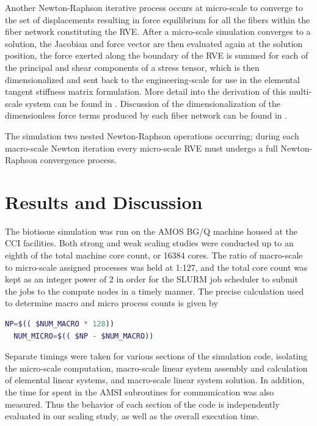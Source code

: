 \documentclass[11pt]{article}
\begin{document}
Another Newton-Raphson iterative process occurs at micro-scale to converge to the set of displacements resulting in force equilibrium for all the fibers within the fiber network constituting the RVE. After a micro-scale simulation converges to a solution, the Jacobian and force vector are then evaluated again at the solution position, the force exerted along the boundary of the RVE is summed for each of the principal and shear components of a stress tensor, which is then dimensionalized and sent back to the engineering-scale for use in the elemental tangent stiffness matrix formulation. More detail into the derivation of this multi-scale system can be found in \cite{stylianopoulos2008thesis} \cite{agoram2001coupled} \cite{stylianopoulos2007multiscale} . Discussion of the dimensionalization of the dimensionless force terms produced by each fiber network can be found in \cite{stylianopoulos2007volume} \cite{chandran2007deterministic}.

The simulation two nested Newton-Raphson operations occurring; during each macro-scale Newton iteration every micro-scale RVE must undergo a full Newton-Raphson convergence process.

\section{Results and Discussion}\label{results}
The biotissue simulation was run on the AMOS BG/Q machine housed at the CCI facilities. Both strong and weak scaling studies were conducted up to an eighth of the total machine core count, or 16384 cores. The ratio of macro-scale to micro-scale assigned processes was held at 1:127, and the total core count was kept as an integer power of 2 in order for the SLURM job scheduler to submit the jobs to the compute nodes in a timely manner. The precise calculation used to determine macro and micro process counts is given by
%
\begin{lstlisting}[language=Bash,caption={process assignment calculation}]
  NP=$(( $NUM_MACRO * 128))
  NUM_MICRO=$(( $NP - $NUM_MACRO))
\end{lstlisting}
\label{macro micro ratio}
%

Separate timings were taken for various sections of the simulation code, isolating the micro-scale computation, macro-scale linear system assembly and calculation of elemental linear systems, and macro-scale linear system solution. In addition, the time for spent in the AMSI subroutines for communication was also measured. Thus the behavior of each section of the code is independently evaluated in our scaling study, as well as the overall execution time.
\end{document}
